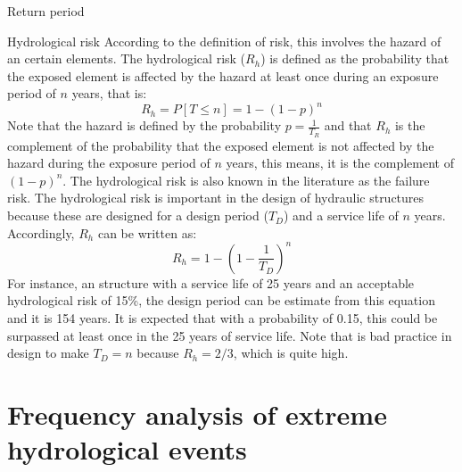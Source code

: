 \documentclass[8pt]{beamer}
\renewcommand{\emph}[1]{\textcolor{myorange}{#1}}
\begin{document}
\begin{frame}{Return period}
    \begin{block}{Hydrological risk}
        According to the definition of risk, this involves the hazard of an certain elements. The \alert{hydrological risk} ($R_h$) is defined as the probability that the exposed element is affected by the hazard at least once during an exposure period  of $n$ years, that is:
        \[
            R_h = P[T \leq n] = 1-(1-p)^n
        \]
        Note that the hazard is defined by the probability $p = \frac{1}{T_R}$ and that $R_h$ is the complement of the probability that the exposed element is not  affected by the hazard during the exposure period of $n$ years, this means, it is the complement of $(1-p)^n$. The \emph{hydrological risk} is also known in the literature as the \alert{failure risk}.
        The \emph{hydrological risk} is important in the design of hydraulic structures because these are designed for a \emph{design period} ($T_D$) and a service life of $n$ years. Accordingly, $R_h$ can be written as:
        \[
            R_h = 1-\left( 1-\frac{1}{T_D} \right)^n
\]
For instance, an structure with a service life of 25 years and an acceptable hydrological risk of 15\%, the design period can be estimate from this equation and it is 154 years. It is expected that with a probability of 0.15, this could be surpassed at least once in the 25 years of service life. Note that is bad practice in design to make $T_D  = n$ because $R_h = 2/3$, which is quite high.
   \end{block}
\end{frame}

\section{Frequency analysis of extreme hydrological events}
\end{document}

